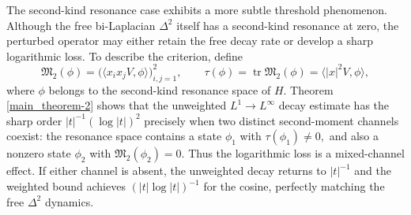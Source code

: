\documentclass[reqno]{amsart}
\numberwithin{equation}{section}
\begin{document}

The second-kind resonance case exhibits a more subtle threshold
phenomenon. Although the free bi-Laplacian $\Delta^2$ itself has a
second-kind resonance at zero, the perturbed operator may either
retain the free decay rate or develop a sharp logarithmic loss. To
describe the criterion, define
\[
\mathfrak M_2(\phi)
=
\bigl(
\langle x_ix_jV,\phi\rangle
\bigr)_{i,j=1}^2,
\qquad
\tau(\phi)
=
\operatorname{tr}\mathfrak M_2(\phi)
=
\langle |x|^2V,\phi\rangle,
\]
where \(\phi\) belongs to the second-kind resonance space of \(H\).
Theorem \ref{main_theorem-2} shows that the unweighted
\(L^1\to L^\infty\) decay estimate has the sharp order
$
|t|^{-1}(\log|t|)^2
$
precisely when two distinct second-moment channels coexist: the
resonance space contains a state \(\phi_1\) with
$
\tau(\phi_1)\neq0,
$
and also a nonzero state \(\phi_2\) with
$
\mathfrak M_2(\phi_2)=0.
$
Thus the logarithmic loss is a mixed-channel effect.  If either
channel is absent, the unweighted decay returns to 
\(|t|^{-1}\) and  the weighted bound achieves $(|t|\log|t|)^{-1}$ for the cosine, perfectly matching the free $\Delta^2$ dynamics.
\end{document}
